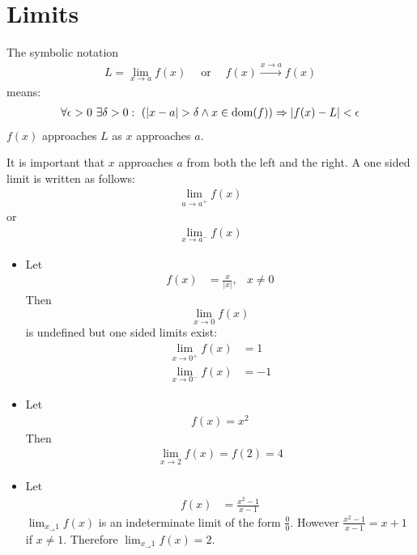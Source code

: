 \section{Limits}
 \begin{df}
  The symbolic notation
  \begin{align*}
  L = \lim_{x \to a} f(x) \quad \operatorname{or} \quad f(x) \overset{x \to a}{\to} f(x)
  \end{align*}
  means:
 \begin{align*}
  \forall \epsilon > 0 ~\exists \delta>0: ~(|x-a|> \delta \wedge x \in \dom(f)) \Rightarrow |f(x) - L| < \epsilon
 \end{align*}
 $f(x)$ approaches $L$ as $x$ approaches $a$. 
 \end{df}
\begin{rk}
It is important that $x$ approaches $a$ from both the left and the right.
A one sided limit is written as follows:
\begin{align*}
\lim_{a \to a^+} f(x)  
\end{align*}
or
\begin{align*}
 \lim_{x \to a^-} f(x)
\end{align*}
\end{rk}


\begin{ex} \mbox \\
\begin{itemize}
\item
Let
\begin{align*}
f(x) & = \frac x {|x|}, & x \neq 0
\end{align*}
Then
\[
\lim_{x \to 0} f(x)
\]
is undefined but one sided limits exist:
\begin{align*}
\lim_{x \to 0^+} f(x) & = 1 \\
\lim_{x \to 0^-} f(x) & = -1 
\end{align*}
\item Let
\begin{align*}
f(x) = x^2 
\end{align*}
Then
\begin{align*}
\lim_{x \to 2} f(x) = f(2) = 4
\end{align*}
\item
Let
\begin{align*}
f(x) & = \frac{x^2-1}{x-1} 
\end{align*}
$\lim_{x_ \to 1} f(x)$ is an indeterminate limit of the form $\frac 0 0$. However $\frac{x^2-1}{x-1} = x+1$ if $x \neq 1$. Therefore $\lim_{x_ \to 1} f(x) = 2$.
\end{itemize}
\end{ex}

